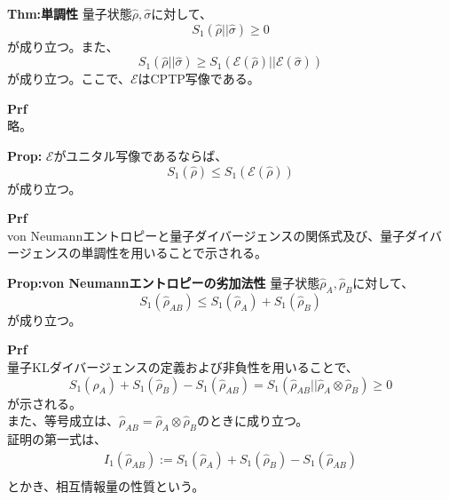 \documentclass[a4paper,11pt]{jsarticle}
\numberwithin{equation}{section}
\begin{document}
\begin{itembox}[l]{\textbf{Thm:単調性}}
    量子状態$\hat{\rho},\hat{\sigma}$に対して、
    \begin{equation}
        S_1(\hat{\rho}||\hat{\sigma}) \geq 0
    \end{equation}
    が成り立つ。また、
    \begin{equation}
        S_1(\hat{\rho}||\hat{\sigma}) \geq S_1(\mathcal{E}(\hat{\rho})||\mathcal{E}(\hat{\sigma}))
    \end{equation}
    が成り立つ。ここで、$\mathcal{E}$はCPTP写像である。

\end{itembox}
\textbf{Prf}\\
略。\hfill \qedsymbol\\

\begin{itembox}[l]{\textbf{Prop:}}
    $\mathcal{E}$がユニタル写像であるならば、
    \begin{equation}
        S_1(\hat{\rho}) \leq S_1(\mathcal{E}(\hat{\rho}))
    \end{equation}
    が成り立つ。
\end{itembox}
\textbf{Prf}\\
von Neumannエントロピーと量子ダイバージェンスの関係式及び、量子ダイバージェンスの単調性を用いることで示される。\hfill \qedsymbol\\

\begin{itembox}[l]{\textbf{Prop:von Neumannエントロピーの劣加法性}}
    量子状態$\hat{\rho}_A,\hat{\rho}_B$に対して、
    \begin{equation}
        S_1(\hat{\rho}_{AB}) \leq S_1(\hat{\rho}_A) + S_1(\hat{\rho}_B)
    \end{equation}
    が成り立つ。
\end{itembox}
\textbf{Prf}\\
量子KLダイバージェンスの定義および非負性を用いることで、
\begin{equation}
S_1(\hat{\rho}_{A}) + S_1(\hat{\rho}_{B}) - S_1(\hat{\rho}_{AB}) = S_1(\hat{\rho}_{AB}||\hat{\rho}_{A} \otimes \hat{\rho}_{B}) \geq 0
\end{equation}
が示される。\hfill \qedsymbol\\
また、等号成立は、$\hat{\rho}_{AB} = \hat{\rho}_{A} \otimes \hat{\rho}_{B}$のときに成り立つ。\\

証明の第一式は、
\begin{align}
    I_1(\hat{\rho}_{AB}) := S_1(\hat{\rho}_{A}) + S_1(\hat{\rho}_{B}) - S_1(\hat{\rho}_{AB})\\
\end{align}
とかき、相互情報量の性質という。\\
\end{document}
